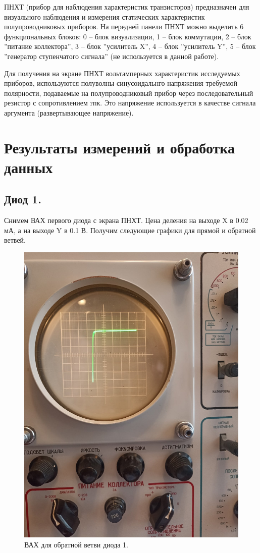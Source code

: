 \documentclass[a4paper, 12pt]{article}
\begin{document}


ПНХТ (прибор для наблюдения характеристик транзисторов) предназначен для визуального наблюдения и измерения статических характеристик полупроводниковых приборов. На передней панели ПНХТ можно выделить 6 функциональных блоков: 0 – блок визуализации, 1 – блок коммутации, 2 – блок ”питание коллектора”, 3 – блок ”усилитель X”, 4 – блок ”усилитель Y”, 5 – блок ”генератор ступенчатого сигнала” (не используется в данной работе).

Для получения на экране ПНХТ вольтамперных характеристик исследуемых приборов, используются полуволны синусоидальнго напряжения требуемой полярности, подаваемые на полупроводниковый прибор через последовательный резистор с сопротивлением rпк. Это напряжение используется в качестве сигнала аргумента (развертывающее напряжение).

\section*{Результаты измерений и обработка данных}
\subsection*{Диод 1.}

Снимем ВАХ первого диода с экрана ПНХТ. Цена деления на выходе X в 0.02 мА, а на выходе Y в 0.1 В. Получим следующие графики для прямой и обратной ветвей.

\begin{figure}[H]
    \centering
    \includegraphics[width=0.4\linewidth]{diod12.jpg}
    \caption{ВАХ для обратной ветви диода 1.}
\end{figure}
\end{document}
